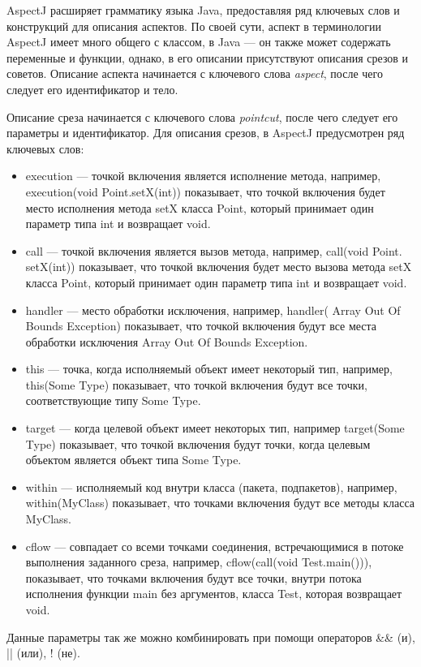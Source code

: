 AspectJ расширяет грамматику языка Java, предоставляя ряд ключевых слов и
конструкций для описания аспектов.
По своей сути, аспект в терминологии AspectJ имеет много общего с классом, в
Java --- он также может содержать переменные и функции, однако, в его описании
присутствуют описания срезов и советов.
Описание аспекта начинается с ключевого слова \textit{aspect}, после чего
следует его идентификатор и тело.

Описание среза начинается с ключевого слова \textit{pointcut}, после чего
следует его параметры и идентификатор.
Для описания срезов, в AspectJ предусмотрен ряд ключевых слов:
  \begin{itemize}
    \item execution --- точкой включения является исполнение метода, 
      например, execution(void Point.setX(int)) показывает, что точкой 
      включения будет место исполнения метода setX класса Point, который 
      принимает один параметр типа int и возвращает void.
    \item call --- точкой включения является вызов метода, например, 
      call(void Point. setX(int)) показывает, что точкой 
      включения будет место вызова метода setX класса Point, который 
      принимает один параметр типа int и возвращает void.
    \item handler --- место обработки исключения, например, 
      handler( Array Out Of Bounds Exception) показывает, что точкой 
      включения будут все места обработки исключения Array Out Of Bounds 
      Exception.
    \item this --- точка, когда исполняемый объект имеет некоторый тип, 
      например, this(Some Type) показывает, что точкой включения будут все 
      точки, соответствующие типу Some Type.
    \item target --- когда целевой объект имеет некоторых тип, например 
      target(Some Type) показывает, что точкой включения будут точки, когда 
      целевым объектом является объект типа Some Type.
    \item within --- исполняемый код внутри класса (пакета, подпакетов), 
      например, within(MyClass) показывает, что точками включения будут все 
      методы класса MyClass.
    \item cflow --- совпадает со всеми точками соединения, встречающимися в 
      потоке выполнения заданного среза, например, cflow(call(void 
      Test.main())), показывает, что точками включения будут все точки, 
      внутри потока исполнения функции main без аргументов, класса Test, 
      которая возвращает void.
  \end{itemize}
Данные параметры так же можно комбинировать при помощи операторов \&\& (и), 
|| (или), ! (не).
  
